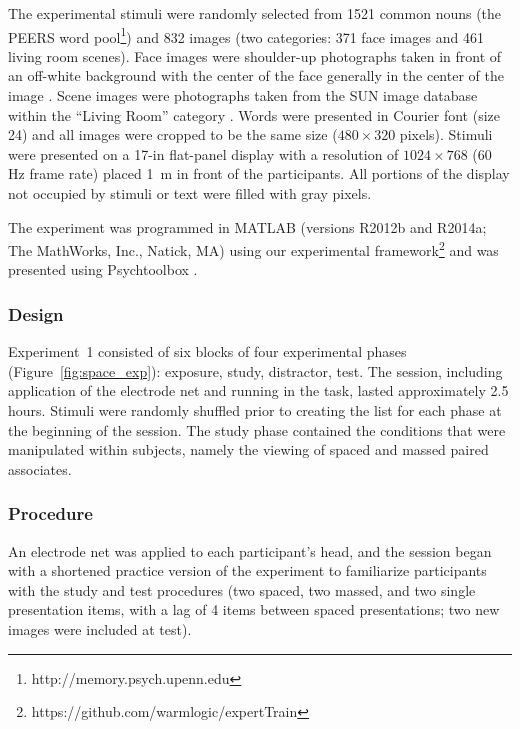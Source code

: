 The experimental stimuli were randomly selected from 1521 common nouns (the PEERS word pool\footnote{http://memory.psych.upenn.edu}) and 832 images (two categories: 371 face images and 461 living room scenes).  Face images were shoulder-up photographs taken in front of an off-white background with the center of the face generally in the center of the image \cite{PhilEtal2000}.  Scene images were photographs taken from the SUN image database within the ``Living Room'' category \cite{XiaoEtal2010}.  Words were presented in Courier font (size 24) and all images were cropped to be the same size ($480\times320$ pixels).  Stimuli were presented on a 17-in flat-panel display with a resolution of $1024\times768$ (60 Hz frame rate) placed 1~m in front of the participants.  All portions of the display not occupied by stimuli or text were filled with gray pixels.

The experiment was programmed in MATLAB (versions R2012b and R2014a; The MathWorks, Inc., Natick, MA) using our experimental framework\footnote{https://github.com/warmlogic/expertTrain} and was presented using Psychtoolbox \cite{Brai1997}.

\subsubsection{Design}

Experiment~1 consisted of six blocks of four experimental phases (Figure~\ref{fig:space_exp}): exposure, study, distractor, test.  The session, including application of the electrode net and running in the task, lasted approximately 2.5 hours.  Stimuli were randomly shuffled prior to creating the list for each phase at the beginning of the session.  The study phase contained the conditions that were manipulated within subjects, namely the viewing of spaced and massed paired associates.

\subsubsection{Procedure}

An electrode net was applied to each participant's head, and the session began with a shortened practice version of the experiment to familiarize participants with the study and test procedures (two spaced, two massed, and two single presentation items, with a lag of 4 items between spaced presentations; two new images were included at test).


